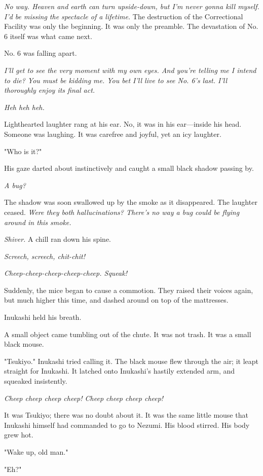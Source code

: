 \emph{No way. Heaven and earth can turn upside-down, but I'm never gonna kill
myself. I'd be missing the spectacle of a lifetime.} The destruction of
the Correctional Facility was only the beginning. It was only the
preamble. The devastation of No. 6 itself was what came next.

No. 6 was falling apart.

\emph{I'll get to see the very moment with my own eyes. And you're telling me
I intend to die? You must be kidding me. You bet I'll live to see No.
6's last. I'll thoroughly enjoy its final act.}

\emph{Heh heh heh.}

Lighthearted laughter rang at his ear. No, it was in his ear---inside his
head. Someone was laughing. It was carefree and joyful, yet an icy
laughter.

"Who is it?"

His gaze darted about instinctively and caught a small black shadow
passing by.

\emph{A bug?}

The shadow was soon swallowed up by the smoke as it disappeared. The
laughter ceased. \emph{Were they both hallucinations? There's no way a bug
could be flying around in this smoke.}

\emph{Shiver.} A chill ran down his spine.

\emph{Screech, screech, chit-chit!}

\emph{Cheep-cheep-cheep-cheep-cheep. Squeak!}

Suddenly, the mice began to cause a commotion. They raised their voices
again, but much higher this time, and dashed around on top of the
mattresses.

Inukashi held his breath.

A small object came tumbling out of the chute. It was not trash. It was
a small black mouse.

"Tsukiyo." Inukashi tried calling it. The black mouse flew through the
air; it leapt straight for Inukashi. It latched onto Inukashi's hastily
extended arm, and squeaked insistently.

\emph{Cheep cheep cheep cheep! Cheep cheep cheep cheep!}

It was Tsukiyo; there was no doubt about it. It was the same little
mouse that Inukashi himself had commanded to go to Nezumi. His blood
stirred. His body grew hot.

"Wake up, old man."

"Eh?"

